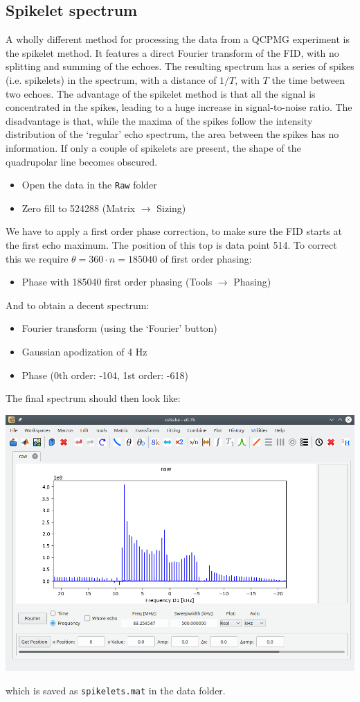 \documentclass[11pt,a4paper]{article}
\begin{document}
\subsection{Spikelet spectrum}
A wholly different method for processing the data from a QCPMG experiment is the spikelet method.
It features a direct Fourier transform of the FID, with no splitting and summing of the echoes.
The resulting spectrum has a series of spikes (i.e. spikelets) in the spectrum, with a distance of $1 /T$, with $T$ the time between two echoes.
The advantage of the spikelet method is that all the signal is concentrated in the spikes, leading to a huge increase in signal-to-noise ratio.
The disadvantage is that, while the maxima of the spikes follow the intensity distribution of the `regular' echo spectrum, the area between the spikes has no information.
If only a couple of spikelets are present, the shape of the quadrupolar line becomes obscured. 


\begin{itemize}
  \item Open the data in the \texttt{Raw} folder
	\item Zero fill to 524288 (Matrix $\longrightarrow$ Sizing)
\end{itemize}
We have to apply a first order phase correction, to make sure the FID starts at the first echo maximum.
The position of this top is data point 514.
To correct this we require $\theta = 360 \cdot n = 185040$ of first order phasing:


\begin{itemize}
  \item Phase with 185040 first order phasing (Tools $\longrightarrow$ Phasing)

\end{itemize}
And to obtain a decent spectrum:
\begin{itemize}
	\item Fourier transform (using the `Fourier' button)
	\item Gaussian apodization of 4 Hz
	\item Phase (0th order: -104, 1st order: -618)
\end{itemize}
The final spectrum should then look like: 
\begin{center}
\includegraphics[width=0.7\linewidth]{Figs/Fig9.png}
\end{center}
which is saved as \texttt{spikelets.mat} in the data folder.
\end{document}
